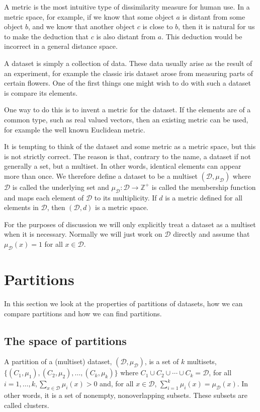 \documentclass[a4paper]{report}
\newcommand{\dset}{\mathcal{D}}
\begin{document}
A metric is the most intuitive type of dissimilarity measure for human use.
In a metric space, for example, if we know that some object $a$ is distant
from some object $b$, and we know that another object $c$ is close to $b$,
then it is natural for us to make the deduction that $c$ is also distant from
$a$.  This deduction would be incorrect in a general distance space.

A dataset is simply a collection of data.  These data usually arise as the
result of an experiment, for example the classic iris dataset arose from
measuring parts of certain flowers.  One of the first things one might wish to
do with such a dataset is compare its elements.

One way to do this is to invent a metric for the dataset.  If the elements are
of a common type, such as real valued vectors, then an existing metric can be
used, for example the well known Euclidean metric.

It is tempting to think of the dataset and some metric as a metric space, but
this is not strictly correct.  The reason is that, contrary to the name, a
dataset if not generally a set, but a multiset.  In other words, identical
elements can appear more than once.  We therefore define a dataset to be a
multiset $(\dset, \mu_{\dset})$ where $\dset$ is called the underlying set and
$\mu_{\dset} \colon \dset \to \mathbb{Z}^+$ is called the membership function
and maps each element of $\dset$ to its multiplicity.  If $d$ is a metric
defined for all elements in $\dset$, then $(\dset, d)$ is a metric space.

For the purposes of discussion we will only explicitly treat a dataset as a
multiset when it is necessary.  Normally we will just work on $\dset$ directly
and assume that $\mu_{\dset}(x) = 1$ for all $x \in \dset$.

\section{Partitions}
\label{sec:partitions}

In this section we look at the properties of partitions of datasets, how we
can compare partitions and how we can find partitions.

\subsection{The space of partitions}
\label{sec:space-partitions}

A partition of a (multiset) dataset, $(\dset,\mu_{\dset})$, is a set of $k$
multisets, $\{(C_1,\mu_1),(C_2,\mu_2),\dotsc,(C_k,\mu_k)\}$ where $C_1 \cup
C_2 \cup \dotsb \cup C_k = \dset$, for all $i = 1,\dotsc,k, \sum_{x \in \dset}
\mu_i(x) > 0$ and, for all $x \in \dset$, $\sum_{i=1}^{k} \mu_i(x) =
\mu_{\dset}(x)$.  In other words, it is a set of nonempty, nonoverlapping
subsets.  These subsets are called clusters.
\end{document}
